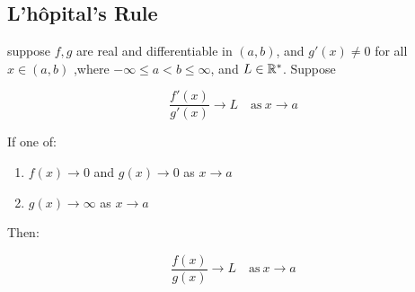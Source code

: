 \subsection{L'h\^{o}pital's Rule}

\begin{thm}
    \label{thm:lhopital}
    suppose $f,g$ are real and differentiable in $(a,b)$, and $g'(x) \ne 0$ for all $x \in (a,b)$
    ,where $-\infty \le a < b \le \infty$, and $L \in \mathbb{R}^*$. Suppose

    \[
        \frac{f'(x)}{g'(x)} \to L \quad \mathrm{as} \: x \to a
    \]

    If one of:

    \begin{enumerate}
        \item $f(x) \to 0$ and $g(x) \to 0$ as $x \to a$

        \item $g(x) \to \infty$ as $x \to a$
    \end{enumerate}

    Then:

    \[
        \frac{f(x)}{g(x)} \to L \quad \mathrm{as}\: x \to a
    \]
\end{thm}

